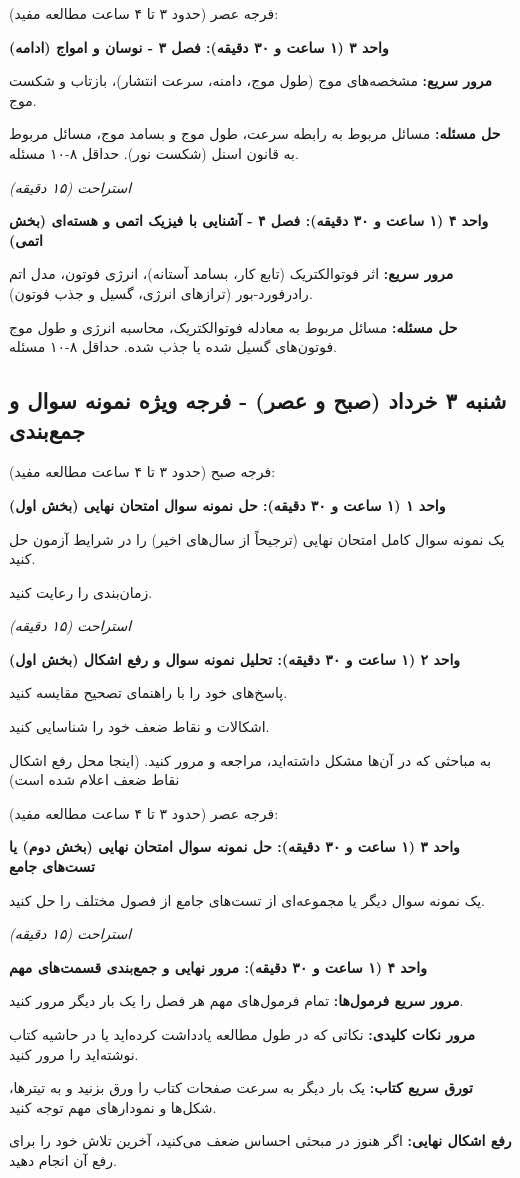 \documentclass[12pt]{article}
\newcommand{\unithead}[1]{\par\vspace{1ex}\noindent\textbf{#1}\par\nopagebreak[4]\vspace{0.5ex}}
\newcommand{\休息}[1]{\par\centering\textit{#1}\par\vspace{1ex}} %
\begin{document}
\vspace{1em}
فرجه عصر (حدود ۳ تا ۴ ساعت مطالعه مفید):

\unithead{واحد ۳ (۱ ساعت و ۳۰ دقیقه): فصل ۳ - نوسان و امواج (ادامه)}
\noindent\textbf{مرور سریع: }مشخصه‌های موج (طول موج، دامنه، سرعت انتشار)، بازتاب و شکست موج.
\par\noindent\textbf{حل مسئله: }مسائل مربوط به رابطه سرعت، طول موج و بسامد موج، مسائل مربوط به قانون اسنل (شکست نور). حداقل ۸-۱۰ مسئله.

\休息{استراحت (۱۵ دقیقه)}

\unithead{واحد ۴ (۱ ساعت و ۳۰ دقیقه): فصل ۴ - آشنایی با فیزیک اتمی و هسته‌ای (بخش اتمی)}
\noindent\textbf{مرور سریع: }اثر فوتوالکتریک (تابع کار، بسامد آستانه)، انرژی فوتون، مدل اتم رادرفورد-بور (ترازهای انرژی، گسیل و جذب فوتون).
\par\noindent\textbf{حل مسئله: }مسائل مربوط به معادله فوتوالکتریک، محاسبه انرژی و طول موج فوتون‌های گسیل شده یا جذب شده. حداقل ۸-۱۰ مسئله.

\subsection*{شنبه ۳ خرداد (صبح و عصر) - فرجه ویژه نمونه سوال و جمع‌بندی}
فرجه صبح (حدود ۳ تا ۴ ساعت مطالعه مفید):

\unithead{واحد ۱ (۱ ساعت و ۳۰ دقیقه): حل نمونه سوال امتحان نهایی (بخش اول)}
یک نمونه سوال کامل امتحان نهایی (ترجیحاً از سال‌های اخیر) را در شرایط آزمون حل کنید.
\par زمان‌بندی را رعایت کنید.

\休息{استراحت (۱۵ دقیقه)}

\unithead{واحد ۲ (۱ ساعت و ۳۰ دقیقه): تحلیل نمونه سوال و رفع اشکال (بخش اول)}
پاسخ‌های خود را با راهنمای تصحیح مقایسه کنید.
\par اشکالات و نقاط ضعف خود را شناسایی کنید.
\par به مباحثی که در آن‌ها مشکل داشته‌اید، مراجعه و مرور کنید. (اینجا محل رفع اشکال نقاط ضعف اعلام شده است)

\vspace{1em}
فرجه عصر (حدود ۳ تا ۴ ساعت مطالعه مفید):

\unithead{واحد ۳ (۱ ساعت و ۳۰ دقیقه): حل نمونه سوال امتحان نهایی (بخش دوم) یا تست‌های جامع}
یک نمونه سوال دیگر یا مجموعه‌ای از تست‌های جامع از فصول مختلف را حل کنید.

\休息{استراحت (۱۵ دقیقه)}

\unithead{واحد ۴ (۱ ساعت و ۳۰ دقیقه): مرور نهایی و جمع‌بندی قسمت‌های مهم}
\noindent\textbf{مرور سریع فرمول‌ها: }تمام فرمول‌های مهم هر فصل را یک بار دیگر مرور کنید.
\par\noindent\textbf{مرور نکات کلیدی: }نکاتی که در طول مطالعه یادداشت کرده‌اید یا در حاشیه کتاب نوشته‌اید را مرور کنید.
\par\noindent\textbf{تورق سریع کتاب: }یک بار دیگر به سرعت صفحات کتاب را ورق بزنید و به تیترها، شکل‌ها و نمودارهای مهم توجه کنید.
\par\noindent\textbf{رفع اشکال نهایی: }اگر هنوز در مبحثی احساس ضعف می‌کنید، آخرین تلاش خود را برای رفع آن انجام دهید.
\end{document}
